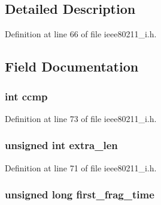 \subsection{Detailed Description}


Definition at line 66 of file ieee80211\-\_\-i.\-h.



\subsection{Field Documentation}
\hypertarget{structieee80211__fragment__entry_af0bf8d0a7415e0d80ce8876f9b5b69a5}{
\subsubsection[{ccmp}]{\setlength{\rightskip}{0pt plus 5cm}int ccmp}}\label{structieee80211__fragment__entry_af0bf8d0a7415e0d80ce8876f9b5b69a5}


Definition at line 73 of file ieee80211\-\_\-i.\-h.

\hypertarget{structieee80211__fragment__entry_afd84bbe6015ef3eb71afe651f3e9f72a}{
\subsubsection[{extra\-\_\-len}]{\setlength{\rightskip}{0pt plus 5cm}unsigned int extra\-\_\-len}}\label{structieee80211__fragment__entry_afd84bbe6015ef3eb71afe651f3e9f72a}


Definition at line 71 of file ieee80211\-\_\-i.\-h.

\hypertarget{structieee80211__fragment__entry_aff13d3635e966dc5c9d34fcba0fa6a59}{
\subsubsection[{first\-\_\-frag\-\_\-time}]{\setlength{\rightskip}{0pt plus 5cm}unsigned long first\-\_\-frag\-\_\-time}}\label{structieee80211__fragment__entry_aff13d3635e966dc5c9d34fcba0fa6a59}


